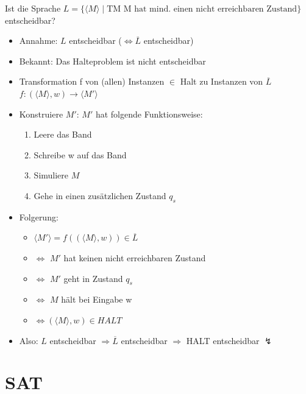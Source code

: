 \begin{frame}
\vspace{-1 cm}
Ist die Sprache $L=\{\langle M \rangle \mid \text{TM M hat mind. einen nicht erreichbaren Zustand}\}$ entscheidbar?
\begin{itemize}
	\item Annahme: $L$ entscheidbar ($\Leftrightarrow \overline{L}$ entscheidbar)
	\item Bekannt: Das Halteproblem ist nicht entscheidbar
	\item Transformation f von (allen) Instanzen $\in$ Halt zu Instanzen von $\overline{L}$~\\ $f:(\langle M \rangle, w) \rightarrow \langle M' \rangle$
	\item Konstruiere $M'$: $M'$ hat folgende Funktionsweise:
	\begin{enumerate}
		\item Leere das Band
		\item Schreibe w auf das Band
		\item Simuliere $M$
		\item Gehe in einen zusätzlichen Zustand $q_s$
	\end{enumerate}
	\item Folgerung:
	\begin{itemize}
		\item $\langle M' \rangle = f((\langle M \rangle, w)) \in \overline{L}$
		\item $\Leftrightarrow$ $M'$ hat keinen nicht erreichbaren Zustand
		\item $\Leftrightarrow$ $M'$ geht in Zustand $q_s$
		\item $\Leftrightarrow$ $M$ hält bei Eingabe w
		\item $\Leftrightarrow (\langle M \rangle, w) \in HALT$
	\end{itemize}
	\item Also: $L$ entscheidbar $\Rightarrow \overline{L}$ entscheidbar $\Rightarrow$ HALT entscheidbar $\lightning$
\end{itemize}
\end{frame}

\section{SAT}
